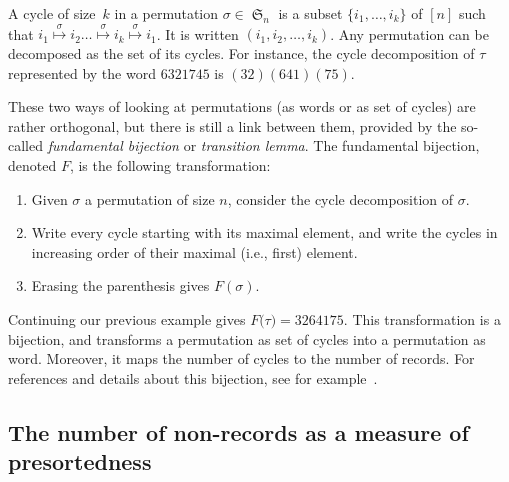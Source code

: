 \documentclass[proceedings]{aofa}
\DeclareMathOperator{\sym}{\mathfrak{S}}
\begin{document}
A cycle of size~$k$ in a permutation $\sigma \in \sym_{n}$ is a subset $\{i_1,\dots,i_k\}$ of $[n]$ such that 
$i_1 \stackrel{\sigma}{\mapsto} i_2 \ldots \stackrel{\sigma}{\mapsto} i_k \stackrel{\sigma}{\mapsto} i_1$. 
It is written $(i_1, i_2, \ldots, i_k)$. 
Any permutation can be decomposed as the set of its cycles. 
For instance, the cycle decomposition of $\tau$ represented by the word $6321745$ is $(32) (641) (75)$. 

These two ways of looking at permutations (as words or as set of cycles) are rather orthogonal, 
but there is still a link between them, provided by the so-called \emph{fundamental bijection} or \emph{transition lemma}. 
The fundamental bijection, denoted $F$, is the following transformation: 
\begin{enumerate}\setlength\itemsep{-1mm}
\item Given $\sigma$ a permutation of size $n$, consider the cycle decomposition of $\sigma$. 
\item Write every cycle starting with its maximal element, 
and write the cycles in increasing order of their maximal (i.e., first) element. 
\item Erasing the parenthesis gives $F(\sigma)$. 
\end{enumerate}
Continuing our previous example gives $F\big( \tau \big) = 3264175$. 
This transformation is a bijection, and transforms a permutation as set of cycles into a permutation as word. 
Moreover, it maps the number of cycles to the number of records. 
For references and details about this bijection, see for example~\cite[p. 109--110]{Bona}. 

\subsection{The number of non-records as a measure of presortedness}\label{sec:presortedness}
\end{document}
